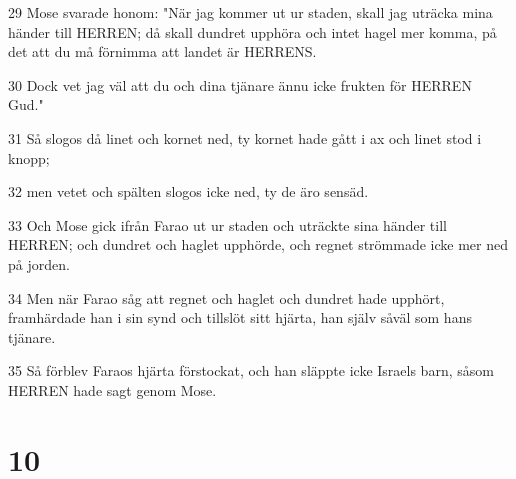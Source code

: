 \par 29 Mose svarade honom: "När jag kommer ut ur staden, skall jag uträcka mina händer till HERREN; då skall dundret upphöra och intet hagel mer komma, på det att du må förnimma att landet är HERRENS.
\par 30 Dock vet jag väl att du och dina tjänare ännu icke frukten för HERREN Gud."
\par 31 Så slogos då linet och kornet ned, ty kornet hade gått i ax och linet stod i knopp;
\par 32 men vetet och spälten slogos icke ned, ty de äro sensäd.
\par 33 Och Mose gick ifrån Farao ut ur staden och uträckte sina händer till HERREN; och dundret och haglet upphörde, och regnet strömmade icke mer ned på jorden.
\par 34 Men när Farao såg att regnet och haglet och dundret hade upphört, framhärdade han i sin synd och tillslöt sitt hjärta, han själv såväl som hans tjänare.
\par 35 Så förblev Faraos hjärta förstockat, och han släppte icke Israels barn, såsom HERREN hade sagt genom Mose.

\chapter{10}

